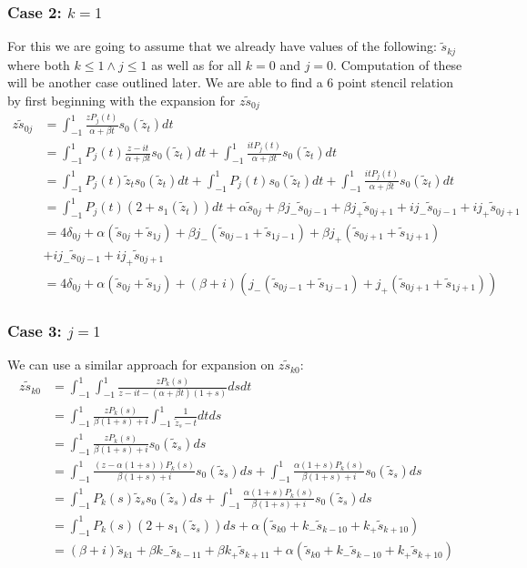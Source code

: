 \documentclass{article}
\begin{document}
\subsubsection*{Case 2: $k=1$}
For this we are going to assume that we already have values of the following: $\tilde{s}_{kj}$ where both $k\leq1 \wedge j\leq1$ as well as for all $k=0$ and $j=0$.
Computation of these will be another case outlined later.
We are able to find a 6 point stencil relation by first beginning with the expansion for $z\tilde{s}_{0j}$
\begin{align}
    z\tilde{s}_{0j}&=\int_{-1}^1\frac{zP_j(t)}{\alpha+\beta t}s_0(\tilde{z}_t)dt\\
    &= \int_{-1}^1P_j(t)\frac{z-it}{\alpha+\beta t}s_0(\tilde{z}_t)dt
    +\int_{-1}^1\frac{itP_j(t)}{\alpha+\beta t}s_0(\tilde{z}_t)dt\\
    &= \int_{-1}^1P_j(t)\tilde{z}_ts_0(\tilde{z}_t)dt
    +\int_{-1}^1P_j(t)s_0(\tilde{z}_t)dt
    +\int_{-1}^1\frac{itP_j(t)}{\alpha+\beta t}s_0(\tilde{z}_t)dt\\
    &= \int_{-1}^1P_j(t)(2+s_1(\tilde{z}_t))dt
    +\alpha \tilde{s}_{0j}+\beta j_-\tilde{s}_{0j-1}+\beta j_+\tilde{s}_{0j+1}
    +i j_-\tilde{s}_{0j-1}+i j_+\tilde{s}_{0j+1}\\
    &=4\delta_{0j}+\alpha(\tilde{s}_{0j}+\tilde{s}_{1j})
    +\beta j_-(\tilde{s}_{0j-1}+\tilde{s}_{1j-1})+\beta j_+(\tilde{s}_{0j+1}+\tilde{s}_{1j+1})\\
    &+i j_-\tilde{s}_{0j-1}+i j_+\tilde{s}_{0j+1} \\
    &=4\delta_{0j}+\alpha(\tilde{s}_{0j}+\tilde{s}_{1j})
    +(\beta+i)(j_-(\tilde{s}_{0j-1}+\tilde{s}_{1j-1})+j_+(\tilde{s}_{0j+1}+\tilde{s}_{1j+1}))
\end{align}

\subsubsection*{Case 3: $j=1$}
We can use a similar approach for expansion on $z\tilde{s}_{k0}$:
\begin{align}
    z\tilde{s}_{k0} &= \int_{-1}^1\int_{-1}^1\frac{zP_k(s)}{z-it-(\alpha+\beta t)(1+s)}dsdt\\
    &=\int_{-1}^1\frac{zP_k(s)}{\beta(1+s)+i}\int_{-1}^1\frac{1}{\tilde{z}_s-t}dtds\\
    &=\int_{-1}^1\frac{zP_k(s)}{\beta(1+s)+i}s_0(\tilde{z}_s)ds\\
    &=\int_{-1}^1\frac{(z-\alpha(1+s))P_k(s)}{\beta(1+s)+i}s_0(\tilde{z}_s)ds
    +\int_{-1}^1\frac{\alpha(1+s)P_k(s)}{\beta(1+s)+i}s_0(\tilde{z}_s)ds\\
    &=\int_{-1}^1P_k(s)\tilde{z}_ss_0(\tilde{z}_s)ds
    +\int_{-1}^1\frac{\alpha(1+s)P_k(s)}{\beta(1+s)+i}s_0(\tilde{z}_s)ds\\
    &=\int_{-1}^1P_k(s)(2+s_1(\tilde{z}_s))ds+\alpha(\tilde{s}_{k0}+k_-\tilde{s}_{k-10}+k_+\tilde{s}_{k+10})\\
    &=(\beta+i)\tilde{s}_{k1}+\beta k_-\tilde{s}_{k-11}+\beta k_+\tilde{s}_{k+11}
    +\alpha(\tilde{s}_{k0}+k_-\tilde{s}_{k-10}+k_+\tilde{s}_{k+10})\\
\end{align}
\end{document}
